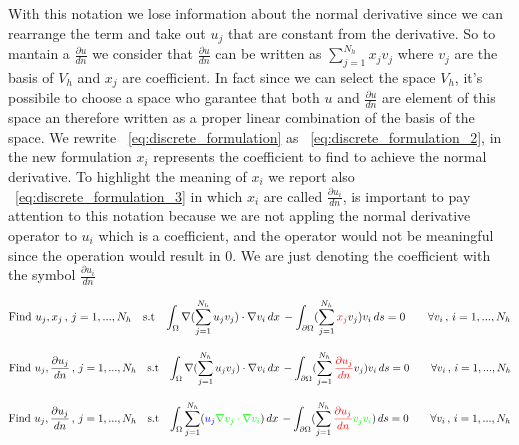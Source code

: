 \documentclass[11pt,onecolumn]{article}
\begin{document}
With this notation we lose information about the normal derivative since we can rearrange the term and take out $u_j$ that are constant from the derivative. So to mantain a $\frac{\partial u}{dn}$ we consider that $\frac{\partial u}{dn}$ can be written as $\sum_{j=1}^{N_h} x_jv_j$ where $v_j$ are the basis of $V_h$ and $x_j$ are coefficient. In fact since we can select the space $V_h$, it's possibile to choose a space who garantee that both $u$ and $\frac{\partial u}{dn}$ are element of this space an therefore written as a proper linear combination of the basis of the space. We rewrite ~\eqref{eq:discrete_formulation} as ~\eqref{eq:discrete_formulation_2}, in the new formulation $x_i$ represents the coefficient to find to achieve the normal derivative. To highlight the meaning of $x_i$ we report also ~\eqref{eq:discrete_formulation_3} in which $x_i$ are called $\frac{\partial u_i}{dn}$, is important to pay attention to this notation because we are not appling the normal derivative operator to $u_i$ which is a coefficient, and the operator would not be meaningful since the operation would result in 0. We are just denoting the coefficient with the symbol $\frac{\partial u_i}{dn}$

\begin{equation}
\begin{aligned}
&\text{Find } u_j ,x_j \,,\, j = 1,...,N_h\quad \text{s.t}
&\int_{\Omega} \nabla (\sum_{j=1}^{N_h} u_jv_j) \cdot \nabla v_i \, dx  \, -\int_{\partial\Omega} (\sum_{j=1}^{N_h} {\color{red}x_j}v_j)v_i\,ds = 0
\qquad \forall v_i \,,\, i = 1,...,N_h
\end{aligned}
\label{eq:discrete_formulation_2}
\end{equation}


\begin{equation}
\begin{aligned}
&\text{Find } u_j, \frac{\partial u_j}{dn}  \,,\, j = 1,...,N_h\quad \text{s.t}
&\int_{\Omega} \nabla (\sum_{j=1}^{N_h} u_jv_j) \cdot \nabla v_i \, dx  \, -\int_{\partial\Omega} (\sum_{j=1}^{N_h} {\color{red}\frac{\partial u_j}{dn} }v_j)v_i\,ds = 0
\qquad \forall v_i \,,\, i = 1,...,N_h
\end{aligned}
\label{eq:discrete_formulation_3}
\end{equation}


\begin{equation}
\begin{aligned}
&\text{Find } u_j,\frac{\partial u_j}{dn}  \,,\, j = 1,...,N_h\quad \text{s.t}
&\int_{\Omega}\sum_{j=1}^{N_h} ({\color{blue} u_j}  {\color{green} \nabla v_j \cdot \nabla v_i})  \, dx  \, -\int_{\partial\Omega} (\sum_{j=1}^{N_h} {\color{red}\frac{\partial u_j}{dn} }{\color{green}v_jv_i})\,ds = 0
\qquad \forall v_i \,,\, i = 1,...,N_h
\end{aligned}
\end{equation}
\end{document}
